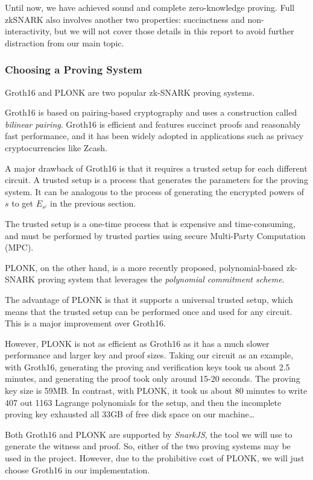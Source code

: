 \documentclass[
]{report}
\begin{document}
Until now, we have achieved sound and complete zero-knowledge proving.
Full zkSNARK also involves another two properties: succinctness
and non-interactivity, but we will not cover those details in this
report to avoid further distraction from our main topic.

\subsubsection{Choosing a Proving System}

Groth16 and PLONK are two popular zk-SNARK proving systems.

Groth16 is based on pairing-based cryptography and uses a construction
called \emph{bilinear pairing}. Groth16 is efficient and features
succinct proofs and reasonably fast performance, and it has been widely
adopted in applications such as privacy cryptocurrencies like Zcash.

A major drawback of Groth16 is that it requires a trusted setup for each
different circuit. A trusted setup is a process that generates the
parameters for the proving system. It can be analogous to the process of
generating the encrypted powers of \(s\) to get \(E_{s^{i}}\) in the
previous section.

The trusted setup is a one-time process that is expensive and
time-consuming, and must be performed by trusted parties using secure
Multi-Party Computation (MPC).

PLONK, on the other hand, is a more recently proposed, polynomial-based
zk-SNARK proving system that leverages the \emph{polynomial commitment
scheme}.

The advantage of PLONK is that it supports a universal trusted setup,
which means that the trusted setup can be performed once and used for
any circuit. This is a major improvement over Groth16.

However, PLONK is not as efficient as Groth16 as it has a much slower
performance and larger key and proof sizes. Taking our circuit as an
example, with Groth16, generating the proving and verification keys took
us about 2.5 minutes, and generating the proof took only around 15-20
seconds. The proving key size is 59MB. In contrast, with PLONK, it took
us about 80 minutes to write 407 out 1163 Lagrange polynomials for the
setup, and then the incomplete proving key exhausted all 33GB of free
disk space on our machine\ldots{}

Both Groth16 and PLONK are supported by \emph{SnarkJS}, the tool we will
use to generate the witness and proof. So, either of the two proving
systems may be used in the project. However, due to the prohibitive cost
of PLONK, we will just choose Groth16 in our implementation.
\end{document}
